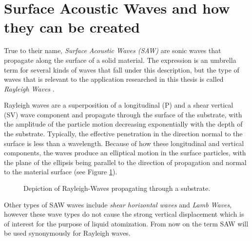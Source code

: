 \section{Surface Acoustic Waves and how they can be created}

True to their name, \emph{Surface Acoustic Waves (SAW)} are sonic waves that propagate along the surface of a solid material. 
The expression is an umbrella term for several kinds of waves that fall under this description, but the type of waves that is relevant to the application researched in this thesis is called \emph{Rayleigh Waves} \cite{mandalSurfaceAcousticWave2022}.

Rayleigh waves are a superposition of a longitudinal (P) and a shear vertical (SV) wave component and propagate through the surface of the substrate, with the amplitude of the particle motion decreasing exponentially with the depth of the substrate. 
Typically, the effective penetration in the direction normal to the surface is less than a wavelength. 
Because of how these longitudinal and vertical components, the waves produce an elliptical motion in the surface particles, with the plane of the ellipsis being parallel to the direction of propagation and normal to the material surface (see Figure \ref{fig:rayleigh}).

\begin{figure}[htbp]
    \centering
    \caption{Depiction of Rayleigh-Waves propagating through a substrate. \cite{mandalSurfaceAcousticWave2022}}
    \label{fig:rayleigh}
\end{figure}

Other types of SAW waves include \emph{shear horizontal waves} and \emph{Lamb Waves}, however these wave types do not cause the strong vertical displacement which is of interest for the purpose of liquid atomization. From now on the term SAW will be used synonymously for Rayleigh waves.

